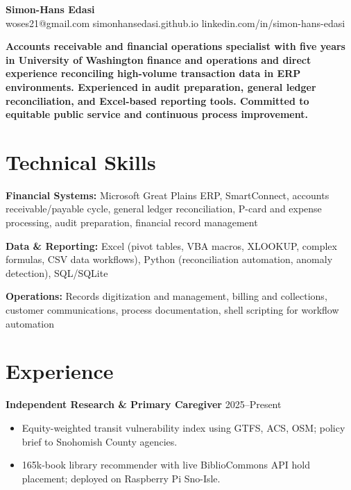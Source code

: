 \documentclass[11pt,a4paper]{article}
\begin{document}
\noindent{}

\begin{center}
    {\LARGE \textbf{Simon-Hans Edasi}} \\[6pt]
    woses21@gmail.com \hfill \textbar \hfill
    simonhansedasi.github.io \hfill \textbar \hfill
    linkedin.com/in/simon-hans-edasi
\end{center}

\vspace{0.3cm}

\noindent
\textbf{Accounts receivable and financial operations specialist with five years in University of Washington finance and operations and direct experience reconciling high-volume transaction data in ERP environments. Experienced in audit preparation, general ledger reconciliation, and Excel-based reporting tools. Committed to equitable public service and continuous process improvement.}

\section*{Technical Skills}

\noindent
\textbf{Financial Systems:} Microsoft Great Plains ERP, SmartConnect, accounts receivable/payable cycle, general ledger reconciliation, P-card and expense processing, audit preparation, financial record management

\noindent
\textbf{Data \& Reporting:} Excel (pivot tables, VBA macros, XLOOKUP, complex formulas, CSV data workflows), Python (reconciliation automation, anomaly detection), SQL/SQLite

\noindent
\textbf{Operations:} Records digitization and management, billing and collections, customer communications, process documentation, shell scripting for workflow automation

\section*{Experience}

\noindent
\textbf{Independent Research \& Primary Caregiver} \hfill 2025--Present
\begin{itemize}
    \item Equity-weighted transit vulnerability index using GTFS, ACS, OSM; policy brief to Snohomish County agencies.
    \item 165k-book library recommender with live BiblioCommons API hold placement; deployed on Raspberry Pi Sno-Isle.
\end{itemize}
\end{document}
